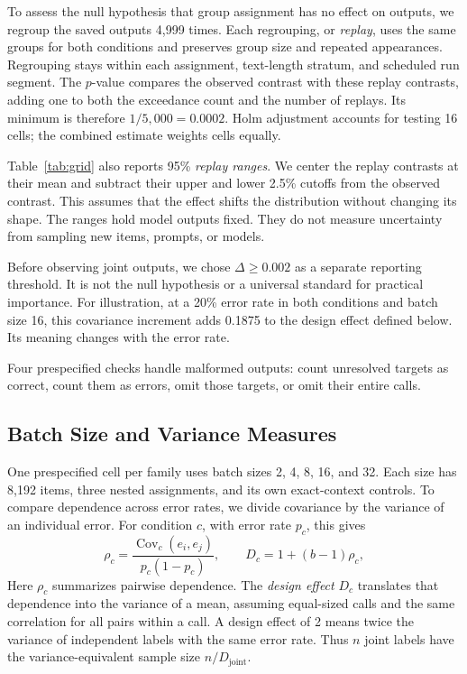 \documentclass[conference]{IEEEtran}
\newcommand{\joint}{\mathrm{joint}}
\begin{document}
To assess the null hypothesis that group assignment has no effect on outputs, we regroup the saved outputs 4,999 times. Each regrouping, or \emph{replay}, uses the same groups for both conditions and preserves group size and repeated appearances. Regrouping stays within each assignment, text-length stratum, and scheduled run segment. The $p$-value compares the observed contrast with these replay contrasts, adding one to both the exceedance count and the number of replays. Its minimum is therefore $1/5{,}000=0.0002$. Holm adjustment accounts for testing 16 cells; the combined estimate weights cells equally.

Table~\ref{tab:grid} also reports 95\% \emph{replay ranges}. We center the replay contrasts at their mean and subtract their upper and lower 2.5\% cutoffs from the observed contrast. This assumes that the effect shifts the distribution without changing its shape. The ranges hold model outputs fixed. They do not measure uncertainty from sampling new items, prompts, or models.

Before observing joint outputs, we chose $\Delta\geq0.002$ as a separate reporting threshold. It is not the null hypothesis or a universal standard for practical importance. For illustration, at a 20\% error rate in both conditions and batch size 16, this covariance increment adds 0.1875 to the design effect defined below. Its meaning changes with the error rate.

Four prespecified checks handle malformed outputs: count unresolved targets as correct, count them as errors, omit those targets, or omit their entire calls.

\subsection{Batch Size and Variance Measures}
One prespecified cell per family uses batch sizes 2, 4, 8, 16, and 32. Each size has 8,192 items, three nested assignments, and its own exact-context controls. To compare dependence across error rates, we divide covariance by the variance of an individual error. For condition $c$, with error rate $p_c$, this gives
\begin{equation}
\rho_c=\frac{\operatorname{Cov}_c(e_i,e_j)}{p_c(1-p_c)},\qquad
D_c=1+(b-1)\rho_c,
\label{eq:de}
\end{equation}
Here $\rho_c$ summarizes pairwise dependence. The \emph{design effect} $D_c$ translates that dependence into the variance of a mean, assuming equal-sized calls and the same correlation for all pairs within a call. A design effect of 2 means twice the variance of independent labels with the same error rate. Thus $n$ joint labels have the variance-equivalent sample size $n/D_\joint$.
\end{document}
